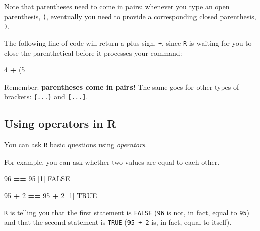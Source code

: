 \documentclass[]{book}
\newenvironment{Shaded}{\begin{snugshade}}{\end{snugshade}}
\newcommand{\DecValTok}[1]{\textcolor[rgb]{0.00,0.00,0.81}{#1}}
\newcommand{\NormalTok}[1]{#1}
\newcommand{\OperatorTok}[1]{\textcolor[rgb]{0.81,0.36,0.00}{\textbf{#1}}}
\newcommand{\OtherTok}[1]{\textcolor[rgb]{0.56,0.35,0.01}{#1}}
\newcommand{\StringTok}[1]{\textcolor[rgb]{0.31,0.60,0.02}{#1}}
\begin{document}
Note that parentheses need to come in pairs: whenever you type an open parenthesis, \texttt{(}, eventually you need to provide a corresponding closed parenthesis, \texttt{)}.

The following line of code will return a plus sign, \texttt{+}, since \texttt{R} is waiting for you to close the parenthetical before it processes your command:

\begin{Shaded}
\begin{Highlighting}[]
\DecValTok{4} \OperatorTok{+}\StringTok{ }\NormalTok{(}\DecValTok{5}
\end{Highlighting}
\end{Shaded}

Remember: \textbf{parentheses come in pairs!} The same goes for other types of brackets: \texttt{\{...\}} and \texttt{{[}...{]}}.

\hypertarget{using-operators-in-r}{%
\subsection*{Using operators in R}\label{using-operators-in-r}}

You can ask \texttt{R} basic questions using \emph{operators}.

For example, you can ask whether two values are equal to each other.

\begin{Shaded}
\begin{Highlighting}[]
\DecValTok{96} \OperatorTok{==}\StringTok{ }\DecValTok{95}
\NormalTok{[}\DecValTok{1}\NormalTok{] }\OtherTok{FALSE}
\end{Highlighting}
\end{Shaded}

\begin{Shaded}
\begin{Highlighting}[]
\DecValTok{95} \OperatorTok{+}\StringTok{ }\DecValTok{2} \OperatorTok{==}\StringTok{ }\DecValTok{95} \OperatorTok{+}\StringTok{ }\DecValTok{2}
\NormalTok{[}\DecValTok{1}\NormalTok{] }\OtherTok{TRUE}
\end{Highlighting}
\end{Shaded}

\texttt{R} is telling you that the first statement is \texttt{FALSE} (\texttt{96} is not, in fact, equal to \texttt{95}) and that the second statement is \texttt{TRUE} (\texttt{95\ +\ 2} is, in fact, equal to itself).
\end{document}
